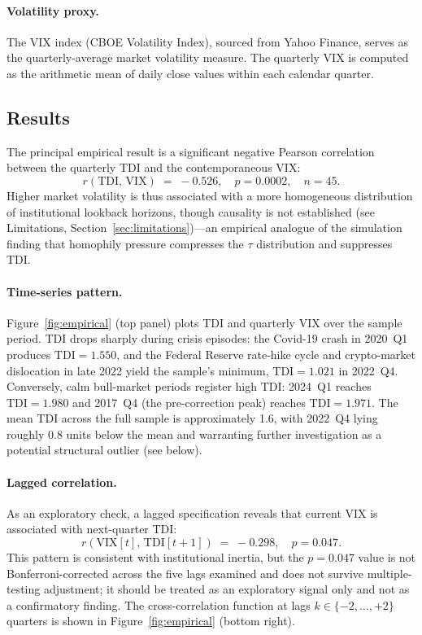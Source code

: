 \documentclass[10pt,twocolumn]{article}
\begin{document}
\paragraph{Volatility proxy.}
The VIX index (CBOE Volatility Index), sourced from Yahoo Finance, serves
as the quarterly-average market volatility measure.  The quarterly VIX is
computed as the arithmetic mean of daily close values within each calendar
quarter.

\subsection{Results}

The principal empirical result is a significant negative Pearson correlation
between the quarterly TDI and the contemporaneous VIX:
\[
  r(\mathrm{TDI},\, \mathrm{VIX}) \;=\; -0.526, \quad p = 0.0002, \quad n = 45.
\]
Higher market volatility is thus associated with a more homogeneous
distribution of institutional lookback horizons, though causality is not established (see Limitations, Section~\ref{sec:limitations})---an empirical analogue of
the simulation finding that homophily pressure compresses the $\tau$
distribution and suppresses TDI.

\paragraph{Time-series pattern.}
Figure~\ref{fig:empirical} (top panel) plots TDI and quarterly VIX over the
sample period.  TDI drops sharply during crisis episodes: the Covid-19 crash
in 2020~Q1 produces $\mathrm{TDI} = 1.550$, and the Federal Reserve
rate-hike cycle and crypto-market dislocation in late 2022 yield the
sample's minimum, $\mathrm{TDI} = 1.021$ in 2022~Q4.  Conversely, calm
bull-market periods register high TDI: 2024~Q1 reaches $\mathrm{TDI} = 1.980$
and 2017~Q4 (the pre-correction peak) reaches $\mathrm{TDI} = 1.971$.  The
mean TDI across the full sample is approximately 1.6, with 2022~Q4 lying
roughly 0.8 units below the mean and warranting further investigation as a
potential structural outlier (see below).

\paragraph{Lagged correlation.}
As an exploratory check, a lagged specification reveals that current VIX
is associated with next-quarter TDI:
\[
  r\!\left(\mathrm{VIX}[t],\, \mathrm{TDI}[t{+}1]\right)
    \;=\; -0.298, \quad p = 0.047.
\]
This pattern is consistent with institutional inertia, but the $p = 0.047$
value is not Bonferroni-corrected across the five lags examined and does
not survive multiple-testing adjustment; it should be treated as an
exploratory signal only and not as a confirmatory finding.
The cross-correlation function at lags $k \in \{-2,\ldots,+2\}$
quarters is shown in Figure~\ref{fig:empirical} (bottom right).
\end{document}
